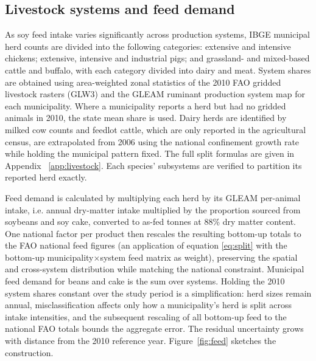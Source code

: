 \subsection{Livestock systems and feed demand}\label{subsec:feed}
As soy feed intake varies significantly across production systems, IBGE municipal herd counts are divided into the following categories: extensive and intensive chickens; extensive, intensive and industrial pigs; and grassland- and mixed-based cattle and buffalo, with each category divided into dairy and meat. System shares are obtained using area-weighted zonal statistics of the 2010 FAO gridded livestock rasters (GLW3) and the GLEAM ruminant production system map for each municipality. Where a municipality reports a herd but had no gridded animals in 2010, the state mean share is used. Dairy herds are identified by milked cow counts and feedlot cattle, which are only reported in the agricultural census, are extrapolated from 2006 using the national confinement growth rate while holding the municipal pattern fixed. The full split formulas are given in Appendix ~\ref{app:livestock}. Each species' subsystems are verified to partition its reported herd exactly.

Feed demand is calculated by multiplying each herd by its GLEAM per-animal intake, i.e. annual dry-matter intake multiplied by the proportion sourced from soybeans and soy cake, converted to as-fed tonnes at 88\% dry matter content. One national factor per product then rescales the resulting bottom-up totals to the FAO national feed figures (an application of equation \eqref{eq:split} with the bottom-up municipality$\times$system feed matrix as weight), preserving the spatial and cross-system distribution while matching the national constraint. Municipal feed demand for beans and cake is the sum over systems. Holding the 2010 system shares constant over the study period is a simplification: herd sizes remain annual, misclassification affects only how a municipality's herd is split across intake intensities, and the subsequent rescaling of all bottom-up feed to the national FAO totals bounds the aggregate error. The residual uncertainty grows with distance from the 2010 reference year. Figure~\ref{fig:feed} sketches the construction.

